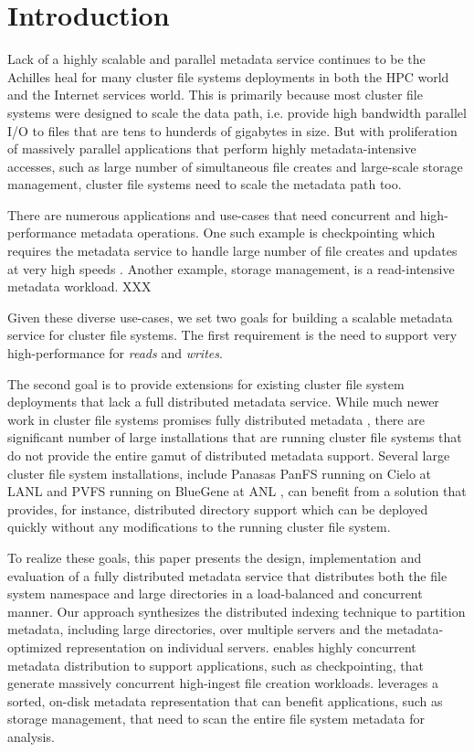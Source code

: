 \section{Introduction}

Lack of a highly scalable and parallel metadata service continues to be the 
Achilles heal for many cluster file systems deployments in both the HPC world 
and the Internet services world.
This is primarily because most cluster file systems were designed to scale the
data path, i.e. provide high bandwidth parallel I/O to files that are tens to
hunderds of gigabytes in size.
But with proliferation of massively parallel applications that perform highly
metadata-intensive accesses, such as large number of simultaneous file creates
and large-scale storage management, cluster file systems need to scale the
metadata path too.

There are numerous applications and use-cases that need concurrent and 
high-performance metadata operations.
One such example is checkpointing which requires the metadata service to
handle large number of file creates and updates at very high speeds \cite{PLFS, GIGA}.
Another example, storage management, is a read-intensive metadata workload. XXX

Given these diverse use-cases, we set two goals for building a scalable
metadata service for cluster file systems. The first requirement
is the need to support very high-performance for \textit{reads} and
\textit{writes}.

The second goal is to provide extensions for existing cluster file system
deployments that lack a full distributed metadata service.
While much newer work in cluster file systems promises fully distributed
metadata \cite{ceph:weil06}, there are significant number of large
installations that are running cluster file systems that do not provide the
entire gamut of distributed metadata support.
Several large cluster file system installations, include Panasas PanFS running
on Cielo at LANL \cite{PanFS} and PVFS running on BlueGene at ANL
\cite{PVFS}, can benefit from a solution that provides, for instance,
distributed directory support which can be deployed quickly without any
modifications to the running cluster file system.

To realize these goals, this paper presents the design, implementation and
evaluation of a fully distributed metadata service that distributes both the
file system namespace and large directories in a load-balanced and concurrent
manner.
Our approach synthesizes the \giga \cite{GIGA} distributed indexing technique to partition
metadata, including large directories, over multiple servers and the \tfs \cite{TableFS}
metadata-optimized representation on individual servers.
\giga{} enables highly concurrent metadata distribution to support applications, 
such as checkpointing, that generate massively concurrent high-ingest file 
creation workloads.
\tfs{} leverages a sorted, on-disk metadata representation that can benefit
applications, such as storage management, that need to scan the entire file
system metadata for analysis. 

